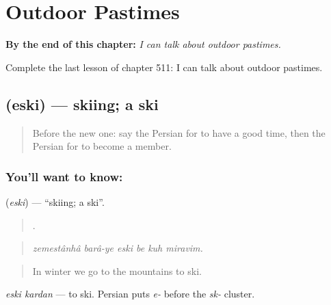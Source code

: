 
\chapter{Outdoor Pastimes}
\label{ch:fa-outdoor-pastimes}

\begin{chapteropening}
\textbf{By the end of this chapter:} \emph{I can talk about outdoor pastimes.}

Complete the last lesson of chapter 511: I can talk about outdoor pastimes.
\end{chapteropening}

\section[\texorpdfstring{\fa{اسکی} (eski)}{اسکی (eski)}]{ (eski) — skiing; a ski}

\label{lesson:FA-C511-eski}



\begin{quote}
Before the new one: say the Persian for to have a good time, then the Persian for to become a member.
\end{quote}

\subsection*{You'll want to know: }
\textbf{} (\emph{eski}) — \textquotedblleft{}skiing; a ski\textquotedblright{}.

\begin{quote}
     .
\end{quote}

\begin{quote}
\emph{zemestânhâ barâ-ye eski be kuh miravim.}
\end{quote}

\begin{quote}
In winter we go to the mountains to ski.
\end{quote}

\emph{eski kardan} — to ski. Persian puts \emph{e-} before the \emph{sk-} cluster.

